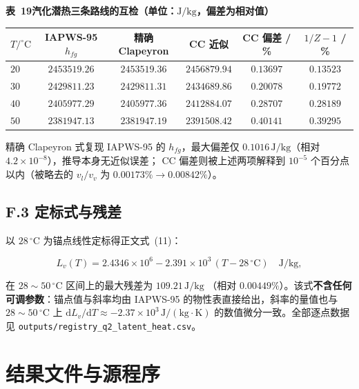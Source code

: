 \documentclass[withoutpreface,bwprint]{cumcmthesis} %
\begin{document}
\begin{appendices}
\begin{table}[htbp]
\centering
\begin{minipage}{0.94\textwidth}
\centering\small
\textbf{表~19\quad 汽化潜热三条路线的互检（单位：$\mathrm{J/kg}$，偏差为相对值）}\\[3pt]
\begin{tabular}{lccccc}
\toprule
$T/^\circ\mathrm{C}$ & IAPWS-95 $h_{fg}$ & 精确 Clapeyron & CC 近似
 & CC 偏差 / \% & $1/Z-1$ / \% \\
\midrule
$20$ & $2453519.26$ & $2453519.36$ & $2456879.94$ & $0.13697$ & $0.13523$ \\
$30$ & $2429811.23$ & $2429811.31$ & $2434689.86$ & $0.20078$ & $0.19772$ \\
$40$ & $2405977.29$ & $2405977.36$ & $2412884.07$ & $0.28707$ & $0.28189$ \\
$50$ & $2381947.13$ & $2381947.19$ & $2391508.42$ & $0.40141$ & $0.39295$ \\
\bottomrule
\end{tabular}
\end{minipage}
\end{table}

\noindent 精确 Clapeyron 式复现 IAPWS-95 的 $h_{fg}$，最大偏差仅
$0.1016\,\mathrm{J/kg}$（相对 $4.2\times10^{-8}$），推导本身无近似误差；
CC 偏差则被上述两项解释到 $10^{-5}$ 个百分点以内（被略去的 $v_l/v_v$ 为
$0.00173\%\to0.00842\%$）。

\subsection*{F.3 定标式与残差}

以 $28\,^\circ\mathrm{C}$ 为锚点线性定标得正文式~(11)：

\begin{equation}
L_v(T)=2.4346\times10^{6}-2.391\times10^{3}\,(T-28\,^\circ\mathrm{C})
\quad \mathrm{J/kg},
\end{equation}

在 $28\sim50\,^\circ\mathrm{C}$ 区间上的最大残差为 $109.21\,\mathrm{J/kg}$
（相对 $0.00449\%$）。该式\textbf{不含任何可调参数}：锚点值与斜率均由 IAPWS-95
的物性表直接给出，斜率的量值也与 $28\sim50\,^\circ\mathrm{C}$ 上
$\mathrm dL_v/\mathrm dT\approx-2.37\times10^{3}\,\mathrm{J/(kg\cdot K)}$
的数值微分一致。全部逐点数据见 \texttt{outputs/registry\_q2\_latent\_heat.csv}。

\section{结果文件与源程序}
\label{app:files}


\end{appendices}
\end{document}

